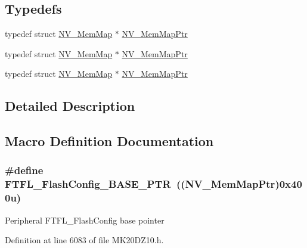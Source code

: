 \subsection*{Typedefs}
\begin{DoxyCompactItemize}
\item 
typedef struct \hyperlink{struct_n_v___mem_map}{N\+V\+\_\+\+Mem\+Map} $\ast$ \hyperlink{group___n_v___peripheral_ga9aac431b01e6b976f2f4e32409ab725f}{N\+V\+\_\+\+Mem\+Map\+Ptr}
\item 
typedef struct \hyperlink{struct_n_v___mem_map}{N\+V\+\_\+\+Mem\+Map} $\ast$ \hyperlink{group___n_v___peripheral_ga9aac431b01e6b976f2f4e32409ab725f}{N\+V\+\_\+\+Mem\+Map\+Ptr}
\item 
typedef struct \hyperlink{struct_n_v___mem_map}{N\+V\+\_\+\+Mem\+Map} $\ast$ \hyperlink{group___n_v___peripheral_ga9aac431b01e6b976f2f4e32409ab725f}{N\+V\+\_\+\+Mem\+Map\+Ptr}
\end{DoxyCompactItemize}


\subsection{Detailed Description}


\subsection{Macro Definition Documentation}
\subsubsection[{\texorpdfstring{F\+T\+F\+L\+\_\+\+Flash\+Config\+\_\+\+B\+A\+S\+E\+\_\+\+P\+TR}{FTFL_FlashConfig_BASE_PTR}}]{\setlength{\rightskip}{0pt plus 5cm}\#define F\+T\+F\+L\+\_\+\+Flash\+Config\+\_\+\+B\+A\+S\+E\+\_\+\+P\+TR~(({\bf N\+V\+\_\+\+Mem\+Map\+Ptr})0x400u)}\hypertarget{group___n_v___peripheral_gad199a235b90fe3e6afb977f2d6a9c565}{}\label{group___n_v___peripheral_gad199a235b90fe3e6afb977f2d6a9c565}
Peripheral F\+T\+F\+L\+\_\+\+Flash\+Config base pointer 

Definition at line 6083 of file M\+K20\+D\+Z10.\+h.


